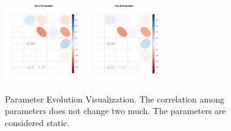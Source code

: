 \begin{figure}[h]
\includegraphics[width=0.3\textwidth,height=0.2\textheight]{Chapters/05MCMCOU/plots/paraEvolution/corMatrix47.pdf}
\includegraphics[width=0.3\textwidth,height=0.2\textheight]{Chapters/05MCMCOU/plots/paraEvolution/corMatrix48.pdf}
\caption{Parameter Evolution Visualization. The correlation among parameters does not change two much. The parameters are considered static. }
\end{figure}
